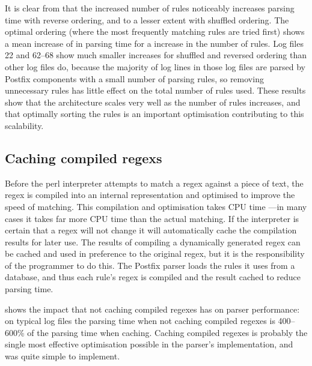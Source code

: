 
It is clear from  that the increased number of rules noticeably
increases parsing time with reverse ordering, and to a lesser extent with
shuffled ordering.  The optimal ordering (where the most frequently
matching rules are tried first) shows a mean increase of
 in parsing time for a
\numberOFrulesMAXIMUMpercentage{} increase in the number of rules.  Log
files 22 and 62--68 show much smaller increases for shuffled and reversed
ordering than other log files do, because the majority of log lines in
those log files are parsed by Postfix components with a small number of
parsing rules, so removing unnecessary rules has little effect on the total
number of rules used.  These results show that the architecture scales very
well as the number of rules increases, and that optimally sorting the rules
is an important optimisation contributing to this scalability.

\newpage{} %
\subsection{Caching compiled regexs}

\label{Caching compiled regexes}

Before the perl interpreter attempts to match a regex against a piece of
text, the regex is compiled into an internal representation and
optimised to improve the speed of matching.  This compilation and
optimisation takes CPU time ---in many cases it takes far more CPU time
than the actual matching.  If the interpreter is certain that a regex
will not change it will automatically cache the compilation results for
later use.   The results of compiling a dynamically generated regex can
be cached and used in preference to the original regex, but it is the
responsibility of the programmer to do this.  The Postfix parser loads the
rules it uses from a database, and thus each rule's regex is compiled
and the result cached to reduce parsing time.

shows the impact that not caching compiled regexes has on parser
performance: on typical log files the parsing time when not caching
compiled regexes is 400--600\% of the parsing time when caching.
Caching compiled regexes is probably the single most effective
optimisation possible in the parser's implementation, and was quite simple
to implement.

